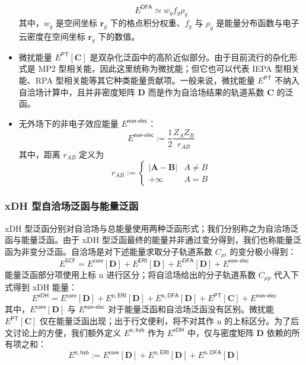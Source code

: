 \begin{itemize}[nosep]
        \begin{equation}
          E^\textsf{DFA} \simeq w_g f_g \rho_g
        \end{equation}
        其中，$w_g$ 是空间坐标 $\bm{r}_g$ 下的格点积分权重、$f_g$ 与 $\rho_g$ 是能量分布函数与电子云密度在空间坐标 $\bm{r}_g$ 下的数值。
  \item 微扰能量 $E^\textsf{PT}[\mathbf{C}]$ 是双杂化泛函中的高阶近似部分。由于目前流行的杂化形式是 MP2 型相关能，因此这里统称为微扰能；但它也可以代表 IEPA 型相关能、RPA 型相关能等其它种类能量贡献项。一般来说，微扰能量 $E^\textsf{PT}$ 不纳入自洽场计算中，且并非密度矩阵 $\mathbf{D}$ 而是作为自洽场结果的轨道系数 $\mathbf{C}$ 的泛函。
  \item 无外场下的非电子效应能量 $E^\textsf{non-elec}$：
        \begin{equation}
          E^\textsf{non-elec} := \frac{1}{2} \frac{Z_A Z_B}{r_{AB}}
        \end{equation}
        其中，距离 $r_{AB}$ 定义为
        \begin{equation*}
          r_{AB} :=
          \begin{cases}
              | \boldsymbol{A} - \boldsymbol{B} | & A \neq B \\
              + \infty & A = B
          \end{cases}
        \end{equation*}
\end{itemize}

\subsubsection{xDH 型自洽场泛函与能量泛函}

xDH 型泛函分别对自洽场与总能量使用两种泛函形式；我们分别称之为\textsf{自洽场泛函}与\textsf{能量泛函}。由于 xDH 型泛函最终的能量并非通过变分得到，我们也称能量泛函为非变分泛函。自洽场是对下述能量求取分子轨道系数 $C_{\mu i}$ 的变分极小得到：
\begin{equation}
  \label{eq.def.eng-SCF}
  E^\textsf{SCF} = E^\textsf{core} [\mathbf{D}] + E^\textsf{ERI} [\mathbf{D}] + E^\textsf{DFA} [\mathbf{D}] + E^\textsf{non-elec}
\end{equation}
能量泛函部分项使用上标 $\mathrm{n}$ 进行区分；将自洽场给出的分子轨道系数 $C_{\mu p}$ 代入下式得到 xDH 能量：
\begin{equation}
  \label{eq.def.eng-xDH}
  E^\textsf{xDH} = E^\textsf{core} [\mathbf{D}] + E^{\mathrm{n}, \textsf{ERI}} [\mathbf{D}] + E^{\mathrm{n}, \textsf{DFA}} [\mathbf{D}] + E^\textsf{PT} [\mathbf{C}] + E^\textsf{non-elec}
\end{equation}
其中，$E^\textsf{core} [\mathbf{D}]$ 与 $E^\textsf{non-elec}$ 对于能量泛函和自洽场泛函没有区别。微扰能 $E^\textsf{PT} [\mathbf{C}]$ 仅在能量泛函出现；出于行文便利，将不对其作 $\mathrm{n}$ 的上标区分。为了后文讨论上的方便，我们额外定义 $E^{\mathrm{n}, \textsf{hyb}}$ 作为 $E^\textsf{xDH}$ 中，仅与密度矩阵 $\mathbf{D}$ 依赖的所有项之和：
\begin{equation}
  \label{eq.def.eng-n-hyb}
  E^{\mathrm{n}, \textsf{hyb}} := E^\textsf{core} [\mathbf{D}] + E^{\mathrm{n}, \textsf{ERI}} [\mathbf{D}] + E^{\mathrm{n}, \textsf{DFA}} [\mathbf{D}]
\end{equation}

